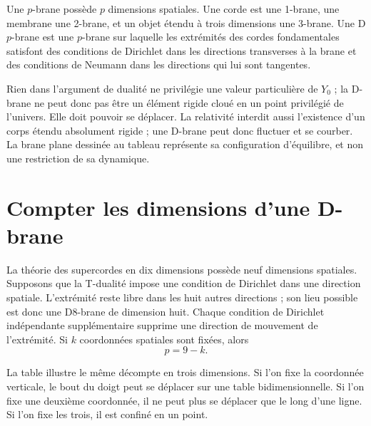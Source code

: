 Une \(p\)-brane possède \(p\) dimensions spatiales. Une corde est une 1-brane, une membrane une 2-brane, et un objet étendu à trois dimensions une 3-brane. Une D\(p\)-brane est une \(p\)-brane sur laquelle les extrémités des cordes fondamentales satisfont des conditions de Dirichlet dans les directions transverses à la brane et des conditions de Neumann dans les directions qui lui sont tangentes.

Rien dans l’argument de dualité ne privilégie une valeur particulière de \(Y_0\) ; la D-brane ne peut donc pas être un élément rigide cloué en un point privilégié de l’univers. Elle doit pouvoir se déplacer. La relativité interdit aussi l’existence d’un corps étendu absolument rigide ; une D-brane peut donc fluctuer et se courber. La brane plane dessinée au tableau représente sa configuration d’équilibre, et non une restriction de sa dynamique.

\begin{classroomqa}
\end{classroomqa}

\section{Compter les dimensions d’une D-brane}

La théorie des supercordes en dix dimensions possède neuf dimensions spatiales. Supposons que la T-dualité impose une condition de Dirichlet dans une direction spatiale. L’extrémité reste libre dans les huit autres directions ; son lieu possible est donc une D8-brane de dimension huit. Chaque condition de Dirichlet indépendante supplémentaire supprime une direction de mouvement de l’extrémité. Si \(k\) coordonnées spatiales sont fixées, alors
\begin{equation}
  p=9-k.
  \label{eq:l10-dp-counting}
\end{equation}

La table illustre le même décompte en trois dimensions. Si l’on fixe la coordonnée verticale, le bout du doigt peut se déplacer sur une table bidimensionnelle. Si l’on fixe une deuxième coordonnée, il ne peut plus se déplacer que le long d’une ligne. Si l’on fixe les trois, il est confiné en un point.

